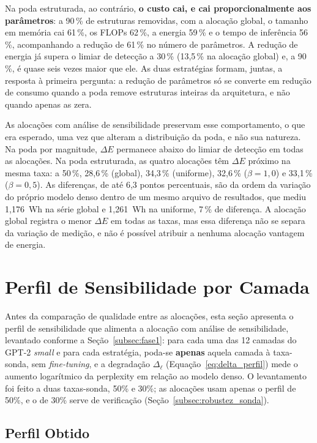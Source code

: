 Na poda estruturada, ao contrário, \textbf{o custo cai, e cai proporcionalmente aos
parâmetros}: a 90\,\% de estruturas removidas, com a alocação global, o tamanho em
memória cai 61\,\%, os FLOPs 62\,\%, a energia 59\,\% e o tempo de inferência 56\,\%,
acompanhando a redução de 61\,\% no número de parâmetros. A redução de energia já supera o
limiar de detecção a 30\,\% (13,5\,\% na alocação global) e, a 90\,\%, é quase seis vezes
maior que ele. As duas estratégias formam, juntas, a resposta à primeira pergunta: a
redução de parâmetros só se converte em redução de consumo quando a poda remove
estruturas inteiras da arquitetura, e não quando apenas as zera.

As alocações com análise de sensibilidade preservam esse comportamento, o que era
esperado, uma vez que alteram a distribuição da poda, e não sua natureza. Na poda por
magnitude, $\Delta E$ permanece abaixo do limiar de detecção em todas as alocações. Na
poda estruturada, as quatro alocações têm $\Delta E$ próximo na mesma taxa: a 50\,\%,
28,6\,\% (global), 34,3\,\% (uniforme), 32,6\,\% ($\beta = 1{,}0$) e 33,1\,\%
($\beta = 0{,}5$). As diferenças, de até 6,3 pontos percentuais, são da ordem da variação
do próprio modelo denso dentro de um mesmo arquivo de resultados, que mediu 1,176~Wh na
série global e 1,261~Wh na uniforme, 7\,\% de diferença. A alocação global registra o menor
$\Delta E$ em todas as taxas, mas essa diferença não se separa da variação de medição, e
não é possível atribuir a nenhuma alocação vantagem de energia.

\section{Perfil de Sensibilidade por Camada}\label{sec:perfil_sensibilidade}

Antes da comparação de qualidade entre as alocações, esta seção apresenta o perfil de
sensibilidade que alimenta a alocação com análise de sensibilidade, levantado conforme a
Seção~\ref{subsec:fase1}: para cada uma das 12 camadas do GPT-2 \textit{small} e para cada
estratégia, poda-se \textbf{apenas} aquela camada à taxa-sonda, sem \textit{fine-tuning},
e a degradação $\Delta_{\ell}$ (Equação~\ref{eq:delta_perfil}) mede o aumento
logarítmico da perplexity em relação ao modelo denso. O levantamento foi feito a duas
taxas-sonda, 50\% e 30\%; as alocações usam apenas o perfil de 50\%, e o de 30\% serve de
verificação (Seção~\ref{subsec:robustez_sonda}).

\subsection{Perfil Obtido}\label{subsec:perfil_obtido}

